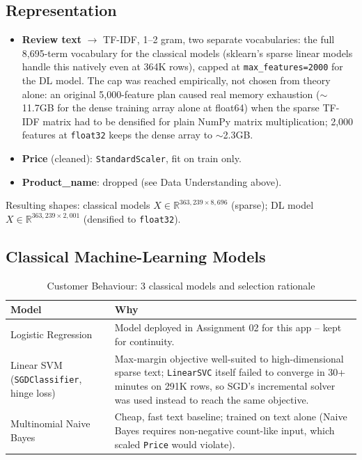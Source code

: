 \documentclass[11pt, a4paper]{article}
\begin{document}
\subsection{Representation}
\begin{itemize}
    \item \textbf{Review text} $\to$ TF-IDF, 1--2 gram, two separate vocabularies: the full
    8,695-term vocabulary for the classical models (sklearn's sparse linear models handle
    this natively even at 364K rows), capped at \texttt{max\_features=2000} for the DL
    model. The cap was reached empirically, not chosen from theory alone: an original
    5,000-feature plan caused real memory exhaustion (\(\sim\)11.7GB for the dense training
    array alone at float64) when the sparse TF-IDF matrix had to be densified for plain
    NumPy matrix multiplication; 2,000 features at \texttt{float32} keeps the dense array
    to \(\sim\)2.3GB.
    \item \textbf{Price} (cleaned): \texttt{StandardScaler}, fit on train only.
    \item \textbf{Product\_name}: dropped (see Data Understanding above).
\end{itemize}
Resulting shapes: classical models $X \in \mathbb{R}^{363,239 \times 8,696}$ (sparse); DL
model $X \in \mathbb{R}^{363,239 \times 2,001}$ (densified to \texttt{float32}).

\subsection{Classical Machine-Learning Models}
\begin{table}[H]
\centering
\begin{tabularx}{\textwidth}{@{}l X@{}}
\toprule
\textbf{Model} & \textbf{Why} \\
\midrule
Logistic Regression & Model deployed in Assignment 02 for this app -- kept for continuity. \\
Linear SVM (\texttt{SGDClassifier}, hinge loss) & Max-margin objective well-suited to
high-dimensional sparse text; \texttt{LinearSVC} itself failed to converge in 30+ minutes
on 291K rows, so SGD's incremental solver was used instead to reach the same objective. \\
Multinomial Naive Bayes & Cheap, fast text baseline; trained on text alone (Naive Bayes
requires non-negative count-like input, which scaled \texttt{Price} would violate). \\
\bottomrule
\end{tabularx}
\caption{Customer Behaviour: 3 classical models and selection rationale}
\end{table}
\end{document}
